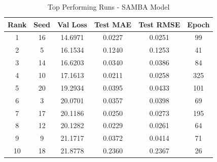 \begin{table}[ht]
\centering
\caption{Top Performing Runs - SAMBA Model}
\label{tab:samba_results}
\begin{tabular}{cccccc}
\hline
\textbf{Rank} & \textbf{Seed} & \textbf{Val Loss} & \textbf{Test MAE} & \textbf{Test RMSE} & \textbf{Epoch} \\
\hline
1 & 16 & 14.6971 & 0.0227 & 0.0251 & 99 \\
2 & 5 & 16.1534 & 0.1240 & 0.1253 & 41 \\
3 & 14 & 16.6203 & 0.0340 & 0.0386 & 84 \\
4 & 10 & 17.1613 & 0.0211 & 0.0258 & 325 \\
5 & 20 & 19.2934 & 0.0395 & 0.0433 & 101 \\
6 & 3 & 20.0701 & 0.0357 & 0.0398 & 69 \\
7 & 17 & 20.1186 & 0.0250 & 0.0273 & 195 \\
8 & 12 & 20.1282 & 0.0229 & 0.0261 & 64 \\
9 & 9 & 21.1717 & 0.0372 & 0.0414 & 71 \\
10 & 18 & 21.8778 & 0.2360 & 0.2367 & 26 \\
\hline
\end{tabular}
\end{table}
